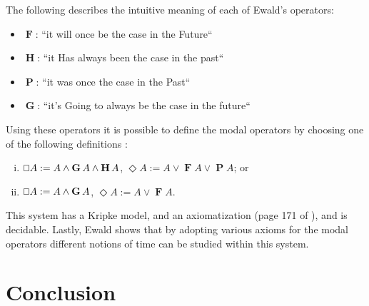 \documentclass{article}
\renewcommand{\Box}{\oblong}
\newcommand{\F}{\mathop{\textbf{F}}}
\renewcommand{\P}{\mathop{\textbf{P}}}
\newcommand{\G}{\mathop{\textbf{G}}}
\renewcommand{\H}{\mathop{\textbf{H}}}
\begin{document}
The following describes the intuitive meaning of each of Ewald's
operators:
\begin{itemize}
\item[] $\F$: ``it will once be the case in the Future``  
\item[] $\H$: ``it Has always been the case in the past``
\item[] $\P$: ``it was once the case in the Past``
\item[] $\G$: ``it's Going to  always be the case in the future``  
\end{itemize}


Using these operators it is possible to define the  modal
operators by choosing one of the following definitions
\cite{ewald1986}:
\begin{enumerate}[i.]
\item $\Box A := A \land \G A \land \H A$, $\Diamond A := A \lor \F A \lor \P A$; or
\item $\Box A := A \land \G A$, $\Diamond A := A \lor \F A$.
\end{enumerate}

This system has a Kripke model, and an axiomatization (page 171 of \cite{ewald1986}), and is decidable.  Lastly, Ewald shows that by
adopting various axioms for the modal operators different notions of
time can be studied within this system.



\section{Conclusion}



\end{document}
